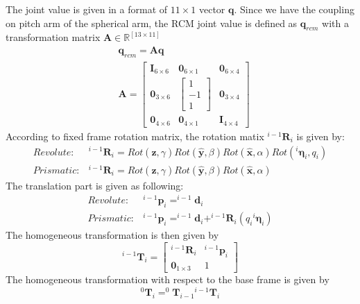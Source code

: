 \documentclass{article}
\begin{document}
The joint value is given in a format of $11\times1$ vector $\mathbf{q}$. Since we have the coupling on pitch arm of the spherical arm, the RCM joint value is defined as $\mathbf{q}_{rcm}$ with a transformation matrix $\mathbf{A} \in \mathbb{R}^{[13\times11]}$
\begin{equation}
\begin{split}
&\mathbf{q}_{rcm} = \mathbf{A} \mathbf{q}\\
&\mathbf{A} = \begin{bmatrix}
\mathbf{I}_{6\times6} & \mathbf{0}_{6\times1} & \mathbf{0}_{6\times4}\\
\mathbf{0}_{3\times6} & \begin{bmatrix}1\\-1\\1\end{bmatrix} & \mathbf{0}_{3\times4}\\
\mathbf{0}_{4\times6} & \mathbf{0}_{4\times1} &\mathbf{I}_{4\times4}
\end{bmatrix}
\end{split}
\end{equation}
According to fixed frame rotation matrix, the rotation matix $^{i-1}\mathbf{R}_i$ is given by:
\begin{equation}
\begin{split}
Revolute: &^{i-1}\mathbf{R}_i = Rot(\hat{\mathbf{z}},\gamma)Rot(\hat{\mathbf{y}},\beta)Rot(\hat{\mathbf{x}},\alpha)Rot(^{i}\boldsymbol{\eta}_i,q_i)\\
Prismatic: &^{i-1}\mathbf{R}_i = Rot(\hat{\mathbf{z}},\gamma)Rot(\hat{\mathbf{y}},\beta)Rot(\hat{\mathbf{x}},\alpha)
\end{split}
\end{equation}
The translation part is given as following:
\begin{equation}
\begin{split}
Revolute: &^{i-1}\mathbf{p}_i = ^{i-1}\mathbf{d}_i\\
Prismatic: &^{i-1}\mathbf{p}_i = ^{i-1}\mathbf{d}_i + ^{i-1}\mathbf{R}_i(q_i {^{i}\boldsymbol{\eta}_i})
\end{split}
\end{equation}
The homogeneous transformation is then given by
\begin{equation}
^{i-1}\mathbf{T}_i = \begin{bmatrix} ^{i-1}\mathbf{R}_i &^{i-1}\mathbf{p}_i \\\mathbf{0}_{1\times3}&1\end{bmatrix}
\end{equation}
The homogeneous transformation with respect to the base frame is given by
\begin{equation}
^{0}\mathbf{T}_i = ^{0}\mathbf{T}_{i-1} {^{i-1}\mathbf{T}_i}
\end{equation}
\end{document}
